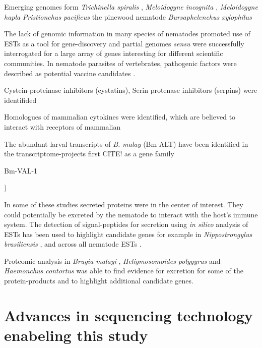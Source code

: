 Emerging genomes form \textit{Trichinella spiralis}
\cite{pmid21336279}, \textit{Meloidogyne incognita}
\cite{pmid18660804}, \textit{Meloidogyne hapla} \cite{pmid18809916}
\textit{Pristionchus pacificus} the pinewood nematode
\textit{Bursaphelenchus xylophilus} \cite{pmid21909270} 

The lack of genomic information in many species of nematodes promoted
use of ESTs as a tool for gene-discovery and partial genomes
\textit{sensu} \cite{parkinson_partigene--constructing_2004} were
successfully interrogated for a large array of genes interesting for
different scientific communities. In nematode parasites of
vertebrates, pathogenic factors were described as potential vaccine
candidates \cite{pmid11406138}.

Cystein-proteinase inhibitors (cystatins), Serin protenase inhibitors
(serpins) were identifided 

Homologues of mammalian cytokines were identified, which are believed
to interact with receptors of mammalian

The abundant larval transcripts of \textit{B. malay} (Bm-ALT) have
been identified in the transcriptome-projects first CITE! as a gene
family  \cite{gomez-escobar_abundant_2002}

Bm-VAL-1

\cite{blaxter_genes_1996, daub_survey_2000,
  parkinson_transcriptomic_2004, mitreva_gene_2004})

In some of these studies secreted proteins were in the center of
interest. They could potentially be excreted by the nematode to
interact with the host's immune system. The detection of
signal-peptides for secretion using \textit{in silico} analysis of
ESTs has been used to highlight candidate genes for example in
\textit{Nippostrongylus brasiliensis} \cite{harcus_signal_2004}, and
across all nematode ESTs \cite{nagaraj_needles_2008}.

Proteomic analysis in \textit{Brugia malayi}
\cite{pmid19352421,pmid18958170}, \textit{Heligmosomoides polygyrus}
\cite{pmid21722761} and \textit{Haemonchus contortus}
\cite{pmid12576473} was able to find evidence for excretion for some
of the protein-products and to highlight additional candidate genes.



\section{Advances in sequencing technology enabeling this study}
\label{ad-seq}

